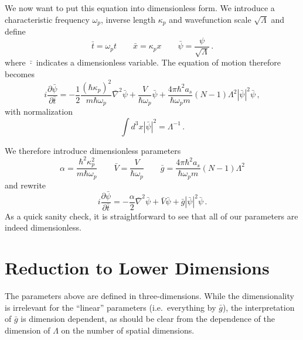\documentclass{revtex4}
\newcommand{\abs}[1]{\ensuremath{\left|#1\right|}}
\begin{document}
We now want to put this equation into dimensionless form.
We introduce a characteristic frequency $\omega_p$, inverse length $\kappa_p$ and wavefunction scale $\sqrt{\Lambda}$ and define
\begin{equation}
  \bar{t} = \omega_p t \qquad \bar{x} = \kappa_p x \qquad \bar{\psi} = \frac{\psi}{\sqrt{\Lambda}} \, .
\end{equation}
where $\bar{\cdot}$ indicates a dimensionless variable.
The equation of motion therefore becomes
\begin{equation}
  i\frac{\partial\bar{\psi}}{\partial\bar{t}} = -\frac{1}{2}\frac{(\hbar\kappa_p)^2}{m\hbar\omega_p}\bar{\nabla}^2\bar{\psi} + \frac{V}{\hbar\omega_p}\bar{\psi} + \frac{4\pi\hbar^2 a_s}{\hbar\omega_p m}(N-1)\Lambda^2\abs{\bar{\psi}}^2\bar{\psi} \, ,
\end{equation}
with normalization
\begin{equation}  
  \int d^3x \abs{\bar{\psi}}^2 = \Lambda^{-1} \, .
\end{equation}

We therefore introduce dimensionless parameters
\begin{equation}
  \alpha = \frac{\hbar^2\kappa_p^2}{m\hbar\omega_p} \qquad \bar{V} = \frac{V}{\hbar\omega_p} \qquad \bar{g} = \frac{4\pi\hbar^2a_s}{\hbar\omega_p m}(N-1)\Lambda^2
\end{equation}
and rewrite
\begin{equation}
    i\frac{\partial\bar{\psi}}{\partial\bar{t}} = -\frac{\alpha}{2}\bar{\nabla}^2\bar{\psi} + \bar{V}\bar{\psi} + \bar{g}\abs{\bar{\psi}}^2\bar{\psi} \, .
\end{equation}
As a quick sanity check, it is straightforward to see that all of our parameters are indeed dimensionless.

\section{Reduction to Lower Dimensions}
The parameters above are defined in three-dimensions.  While the dimensionality is irrelevant for the ``linear'' parameters (i.e.\ everything by $\bar{g}$), the interpretation of $\bar{g}$ is dimension dependent, as should be clear from the dependence of the dimension of $\Lambda$ on the number of spatial dimensions.
\end{document}
